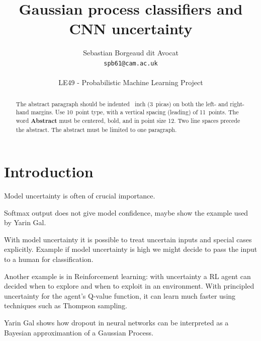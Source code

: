 \documentclass{article}
\title{Gaussian process classifiers and CNN uncertainty}
\author{
  Sebastian Borgeaud dit Avocat \\
  \texttt{spb61@cam.ac.uk} \\ \\
  LE49 - Probabilistic Machine Learning Project
}
\begin{document}

\maketitle

\begin{abstract}
  The abstract paragraph should be indented ~inch
  (3~picas) on both the left- and right-hand margins. Use 10~point
  type, with a vertical spacing (leading) of 11~points.  The word
  \textbf{Abstract} must be centered, bold, and in point size 12. Two
  line spaces precede the abstract. The abstract must be limited to
  one paragraph.
\end{abstract}

\section{Introduction}
Model uncertainty is often of crucial importance.

Softmax output does not give model confidence, maybe show the example used by Yarin Gal.

With model uncertainty it is possible to treat uncertain inputs and special cases explicitly. Example if model uncertainty is high we might decide to pass the input to a human for classification.

Another example is in Reinforcement learning: with uncertainty a RL agent can decided when to explore and when to exploit in an environment. With principled uncertainty for the agent's Q-value function, it can learn much faster using techniques such as Thompson sampling.

Yarin Gal shows how dropout in neural networks can be interpreted as a Bayesian approximantion of a Gaussian Process.
\end{document}

